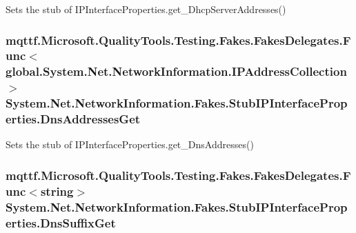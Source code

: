 Sets the stub of I\-P\-Interface\-Properties.\-get\-\_\-\-Dhcp\-Server\-Addresses()

\hypertarget{class_system_1_1_net_1_1_network_information_1_1_fakes_1_1_stub_i_p_interface_properties_abef34a387efd3de224aff622c76a3185}{
\subsubsection[{Dns\-Addresses\-Get}]{\setlength{\rightskip}{0pt plus 5cm}mqttf.\-Microsoft.\-Quality\-Tools.\-Testing.\-Fakes.\-Fakes\-Delegates.\-Func$<$global.\-System.\-Net.\-Network\-Information.\-I\-P\-Address\-Collection$>$ System.\-Net.\-Network\-Information.\-Fakes.\-Stub\-I\-P\-Interface\-Properties.\-Dns\-Addresses\-Get}}\label{class_system_1_1_net_1_1_network_information_1_1_fakes_1_1_stub_i_p_interface_properties_abef34a387efd3de224aff622c76a3185}


Sets the stub of I\-P\-Interface\-Properties.\-get\-\_\-\-Dns\-Addresses()

\hypertarget{class_system_1_1_net_1_1_network_information_1_1_fakes_1_1_stub_i_p_interface_properties_ad1870a659497be7645823c7278647030}{
\subsubsection[{Dns\-Suffix\-Get}]{\setlength{\rightskip}{0pt plus 5cm}mqttf.\-Microsoft.\-Quality\-Tools.\-Testing.\-Fakes.\-Fakes\-Delegates.\-Func$<$string$>$ System.\-Net.\-Network\-Information.\-Fakes.\-Stub\-I\-P\-Interface\-Properties.\-Dns\-Suffix\-Get}}\label{class_system_1_1_net_1_1_network_information_1_1_fakes_1_1_stub_i_p_interface_properties_ad1870a659497be7645823c7278647030}


